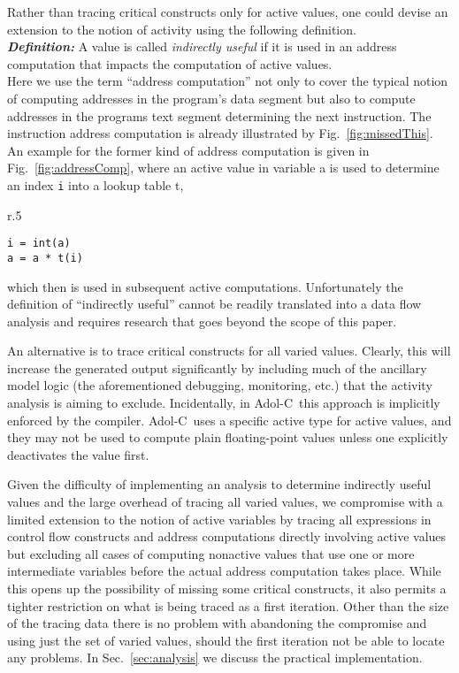 \documentclass{article}
\newcommand{\adolc}{\mbox{Adol-C}}
\newcommand{\refsec}[1]{{Sec.~\ref{#1}}}
\newcommand{\reffig}[1]{{Fig.~\ref{#1}}}
\begin{document}
Rather than tracing critical constructs only for  active values, 
one could devise an extension to the notion of activity using the following 
definition.\\
{\bf\em  Definition: } A value is called {\em indirectly useful} 
if it is used in an address computation that impacts 
the  computation of active values.\\
Here we use the term  ``address computation'' not only  to cover the typical notion of 
computing addresses in the program's data segment but also to compute 
addresses in the programs text segment determining the next instruction. 
The instruction address computation is already illustrated by \reffig{fig:missedThis}.
An example for the former kind of address computation is given in 
\reffig{fig:addressComp}, where an active value in variable a is used to 
determine an index \lstinline{i} into a lookup table t,
\begin{wrapfigure}{r}{.5\textwidth}
\begin{minipage}{.95\linewidth}
\begin{lstlisting}[frame=single]
i = int(a) 
a = a * t(i)
\end{lstlisting}
\end{minipage}
\caption{An address computation into a lookup table impacting the subsequent computation}\label{fig:addressComp} 
\end{wrapfigure}
which then is used in 
subsequent active computations.
Unfortunately the definition of ``indirectly useful'' cannot be readily translated  into a data flow analysis and requires research that goes beyond the scope of this paper.   

An alternative is  to  trace critical constructs for all varied values. 
Clearly, this will increase the generated output significantly by including much 
of the ancillary model logic (the aforementioned debugging, monitoring, etc.) that 
the activity analysis is aiming to exclude. 
Incidentally, in \adolc\ this approach is implicitly enforced by the compiler. 
\adolc\ uses a specific  
active type for active values, and they may not be used to 
compute plain floating-point values unless one 
explicitly deactivates the value first. 

Given the difficulty of implementing an analysis to determine indirectly useful values 
and the large overhead of tracing all varied values, we 
compromise with a limited extension to the notion of active variables by tracing  
all expressions in control flow constructs and address computations directly involving active values
but excluding all cases of computing nonactive values that use one or more intermediate 
variables before the actual address computation takes place. 
While this opens up the possibility of missing some critical constructs, 
it also permits a tighter restriction on what is being traced as a first iteration. 
Other than the size of the tracing data  there is no problem with abandoning the compromise
and using just the set of varied values, should the first iteration not be able to 
locate any problems.    
In \refsec{sec:analysis} we discuss the practical implementation.
\end{document}
